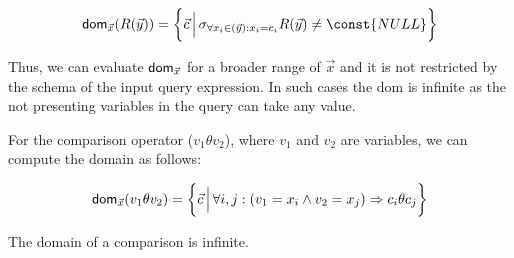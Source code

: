\documentclass[12pt]{article}
\newcommand{\dom}{\textsf{dom}}
\begin{document}
\begin{equation}
\label{def:relation}
\dom{}_{\vec x}(R(\vec y))=\bigg\{\vec c\,\Big|\,\sigma_{\forall x_i\in(\vec{y}): x_{i}=c_{i}}R(\vec y)\not= \const{NULL}\bigg\}
\end{equation}

Thus, we can evaluate $\text{\dom}_{\vec{x}}$ for a broader range of $\vec{x}$ and it is not restricted by the schema of the input query expression. In such cases the \dom{} is infinite as the not presenting variables in the query can take any value.

For the comparison operator ($v_{1}\theta v_{2}$), where $v_1$ and $v_2$ are variables, we can compute the domain as follows:

\begin{equation}
\text{\dom{}}_{\vec{x}}(v_{1}\theta v_{2})=\bigg\{\vec{c}\,\Big|\,\forall i,j:(v_{1}=x_{i}\land v_{2}=x_{j})\Rightarrow c_{i}\theta c_{j}\bigg\}
\end{equation}

The domain of a comparison is infinite.
\end{document}
